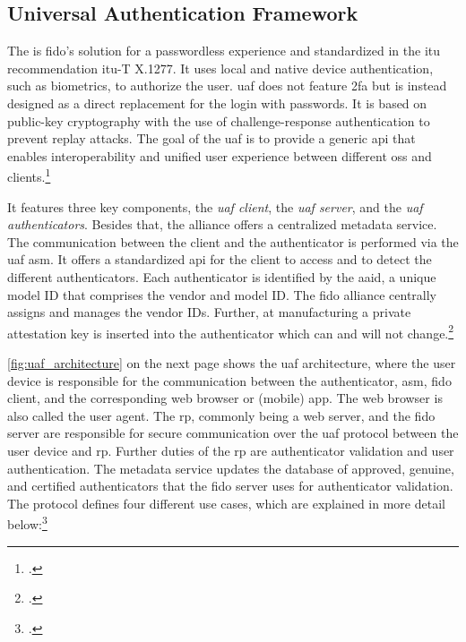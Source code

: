 \subsection{Universal Authentication Framework}

The  is \gls{fido}'s solution for a passwordless experience and standardized in the \gls{itu} recommendation \gls{itu}-T X.1277. It uses local and native device authentication, such as biometrics, to authorize the user. \gls{uaf} does not feature \gls{2fa} but is instead designed as a direct replacement for the login with passwords. It is based on public-key cryptography with the use of challenge-response authentication to prevent replay attacks. The goal of the \gls{uaf} is to provide a generic \gls{api} that enables interoperability and unified user experience between different \glspl{os} and clients.\footcites[See][249]{Schwartz2018}[See][197--198]{dasgupta2017multi}[See][]{itu-uaf}

It features three key components, the \textit{\gls{uaf} client}, the \textit{\gls{uaf} server}, and the \textit{\gls{uaf} authenticators}. Besides that, the alliance offers a centralized metadata service. The communication between the client and the authenticator is performed via the \gls{uaf} \gls{asm}. It offers a standardized \gls{api} for the client to access and to detect the different authenticators. Each authenticator is identified by the \gls{aaid}, a unique model ID that comprises the vendor and model ID. The \gls{fido} alliance centrally assigns and manages the vendor IDs. Further, at manufacturing a private attestation key is inserted into the authenticator which can and will not change.\footcites[See][145]{10.1007/978-3-319-26502-5_10}[See][8]{uaf-protocol}

\autoref{fig:uaf_architecture} on the next page shows the \gls{uaf} architecture, where the user device is responsible for the communication between the authenticator, \gls{asm}, \gls{fido} client, and the corresponding web browser or (mobile) app. The web browser is also called the user agent. The \gls{rp}, commonly being a web server, and the \gls{fido} server are responsible for secure communication over the \gls{uaf} protocol between the user device and \gls{rp}. Further duties of the \gls{rp} are authenticator validation and user authentication. The metadata service updates the database of approved, genuine, and certified authenticators that the \gls{fido} server uses for authenticator validation. The protocol defines four different use cases, which are explained in more detail below:\footcites[See][4]{uaf-protocol}

